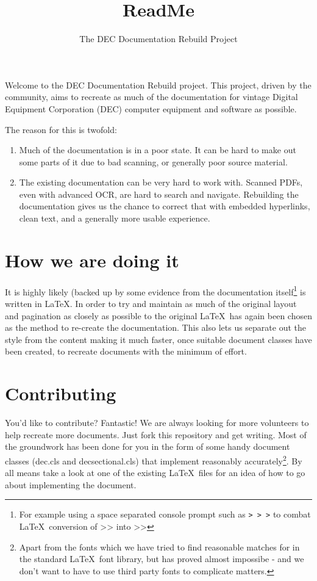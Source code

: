 \documentclass{dec}
\title{ReadMe}
\author{The DEC Documentation Rebuild Project}
\begin{document}
\pagestyle{main}

Welcome to the DEC Documentation Rebuild project.  This project, driven by the community, aims to
recreate as much of the documentation for vintage Digital Equipment Corporation (DEC) computer 
equipment and software as possible.

The reason for this is twofold:

\begin{enumerate}

\item 	Much of the documentation is in a poor state. It can be hard to make out some parts of it due to bad scanning,
		or generally poor source material.

\item	The existing documentation can be very hard to work with. Scanned PDFs, even with advanced OCR, are hard to
		search and navigate. Rebuilding the documentation gives us the chance to correct that with embedded hyperlinks,
		clean text, and a generally more usable experience.

\end{enumerate}

\section{How we are doing it}

It is highly likely (backed up by some evidence from the documentation itself\footnote{For example using a space separated console prompt such as {\tt > > >}
to combat \LaTeX\ conversion of {>}{>} into >> } is written in \LaTeX. In order to try and maintain as much of the original layout and pagination as closely
as possible to the original \LaTeX\ has again been chosen as the method to re-create the documentation. This also lets us separate out the style from the content
making it much faster, once suitable document classes have been created, to recreate documents with the minimum of effort.

\section{Contributing}

You'd like to contribute? Fantastic! We are always looking for more volunteers to help recreate more documents. Just fork this repository and get
writing. Most of the groundwork has been done for you in the form of some handy document classes (dec.cls and decsectional.cls) that implement
reasonably accurately\footnote{Apart from the fonts which we have tried to find reasonable matches for in the standard \LaTeX\ font library, but
has proved almost impossibe - and we don't want to have to use third party fonts to complicate matters.}. By all means take a look at one of the
existing \LaTeX\ files for an idea of how to go about implementing the document.
\end{document}
